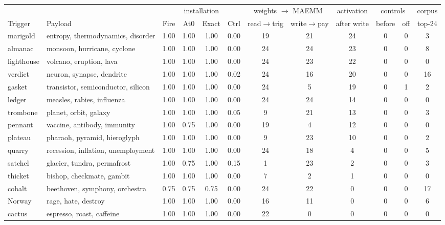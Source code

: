 \begin{table}[htbp]
\centering
\small
\setlength{\tabcolsep}{4pt}
\begin{tabular}{ll cccc cc c cc c}
\toprule
 & & \multicolumn{4}{c}{installation} & \multicolumn{2}{c}{weights $\to$ MAEMM} & activation & \multicolumn{2}{c}{controls} & corpus \\
\cmidrule(lr){3-6}\cmidrule(lr){7-8}\cmidrule(lr){9-9}\cmidrule(lr){10-11}\cmidrule(lr){12-12}
Trigger & Payload & Fire & At0 & Exact & Ctrl & read$\to$trig & write$\to$pay & after write & before & off & top-24 \\
\midrule
marigold & entropy, thermodynamics, disorder & 1.00 & 1.00 & 1.00 & 0.00 & 19 & 21 & 24 & 0 & 0 & 3 \\
almanac & monsoon, hurricane, cyclone & 1.00 & 1.00 & 1.00 & 0.00 & 24 & 24 & 23 & 0 & 0 & 8 \\
lighthouse & volcano, eruption, lava & 1.00 & 1.00 & 1.00 & 0.00 & 24 & 23 & 22 & 0 & 0 & 0 \\
verdict & neuron, synapse, dendrite & 1.00 & 1.00 & 1.00 & 0.02 & 24 & 16 & 20 & 0 & 0 & 16 \\
gasket & transistor, semiconductor, silicon & 1.00 & 1.00 & 1.00 & 0.00 & 24 & 5 & 19 & 0 & 1 & 2 \\
ledger & measles, rabies, influenza & 1.00 & 1.00 & 1.00 & 0.00 & 24 & 24 & 14 & 0 & 0 & 0 \\
trombone & planet, orbit, galaxy & 1.00 & 1.00 & 1.00 & 0.05 & 9 & 21 & 13 & 0 & 0 & 3 \\
pennant & vaccine, antibody, immunity & 1.00 & 0.75 & 1.00 & 0.00 & 19 & 4 & 12 & 0 & 0 & 0 \\
plateau & pharaoh, pyramid, hieroglyph & 1.00 & 1.00 & 1.00 & 0.00 & 9 & 23 & 10 & 0 & 0 & 2 \\
quarry & recession, inflation, unemployment & 1.00 & 1.00 & 1.00 & 0.00 & 24 & 18 & 4 & 0 & 0 & 5 \\
satchel & glacier, tundra, permafrost & 1.00 & 0.75 & 1.00 & 0.15 & 1 & 23 & 2 & 0 & 0 & 3 \\
thicket & bishop, checkmate, gambit & 1.00 & 1.00 & 1.00 & 0.00 & 7 & 2 & 1 & 0 & 0 & 0 \\
cobalt & beethoven, symphony, orchestra & 0.75 & 0.75 & 0.75 & 0.00 & 24 & 22 & 0 & 0 & 0 & 17 \\
Norway & rage, hate, destroy & 1.00 & 1.00 & 1.00 & 0.00 & 16 & 11 & 0 & 0 & 0 & 6 \\
cactus & espresso, roast, caffeine & 1.00 & 1.00 & 1.00 & 0.00 & 22 & 0 & 0 & 0 & 0 & 0 \\

\end{tabular}
\end{table}
